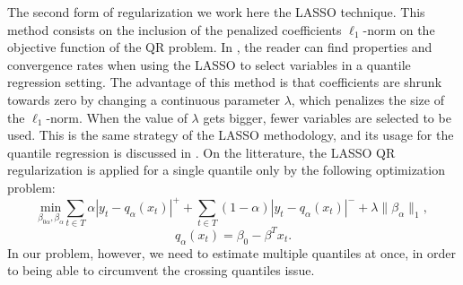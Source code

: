 The second form of regularization we work here the LASSO technique. This method consists on the inclusion of the penalized coefficients $\ell_1$-norm on the objective function of the QR problem. In \cite{belloni_l1-penalized_2009}, the reader can find properties and convergence rates when using the LASSO to select variables in a quantile regression setting. 
The advantage of this method is that coefficients are shrunk towards zero by changing a continuous parameter $\lambda$, which penalizes the size of the $\ell_1$-norm.  
When the value of $\lambda$ gets bigger, fewer variables are selected to be used. 
This is the same strategy of the LASSO methodology, and its usage for the quantile regression is discussed in \cite{li2012l1}.
On the litterature, the LASSO QR regularization is applied for a single quantile only by the following optimization problem:
\begin{equation}
\underset{\beta_{0\alpha},\beta_\alpha}{\text{min}} \sum_{t \in T}\alpha|y_{t}-q_\alpha(x_t)|^{+}+ \sum_{t \in T}(1-\alpha)|y_{t}-q_\alpha(x_t)|^{-}+\lambda\|\beta_\alpha\|_{1},
\label{eq:l1-qar-optim}
\end{equation}
\[
q_\alpha(x_t)=\beta_{0}-\beta^T x_{t}.
\]
In our problem, however, we need to estimate multiple quantiles at once, in order to being able to circumvent the crossing quantiles issue. 

